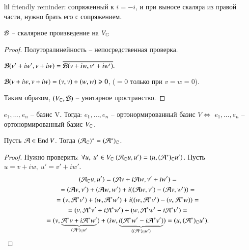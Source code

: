 \documentclass[main]{subfiles}
\begin{document}
    lil friendly reminder: сопряженный к $i = -i$, и при выносе скаляра из правой части, нужно брать его с сопряжением.

    \begin{proposition}
        $\mathcal{B}$ -- скалярное произведение на $V_{\mathbb{C}}$
    \end{proposition}
    \begin{proof}
        Полуторалинейность -- непосредственная проверка. 

        $\mathcal{B}(v'+iw', v+iw) = \overline{\mathcal{B}(v + i w, v' + iw')}.$ 

        $\mathcal{B}(v + iw, v + iw) = (v, v) + (w, w) \geqslant 0$, ($=0$ только при $v = w = 0$).

        Таким образом, $(V_{\mathbb{C}}, \mathcal{B})$ -- унитарное пространство.
    \end{proof}

    \begin{remark}
         $e_1, \ldots, e_n$ -- базис V. Тогда: $e_1, \ldots, e_n$ -- ортонормированный базис $V \Leftrightarrow$  $e_1, \ldots, e_n$ -- ортонормированный базис $V_{\mathbb{C}}$.
    \end{remark}

    \begin{proposition}
        Пусть $\mathcal{A} \in \operatorname{End} V$. Тогда $(\mathcal{A}_{\mathbb{C}})^* = (\mathcal{A}^*)_{\mathbb{C}}$.
    \end{proposition}

    \begin{proof}
        Нужно проверить: $\forall u, \ u' \in V_{\mathbb{C}} \ (\mathcal{A}_{\mathbb{C}}u, u') = (u, (\mathcal{A}^*)_{\mathbb{C}} u')$. 
        Пусть  $u = v + iw, \ u' = v' + iw'$.
        \begin{multline*}
            (\mathcal{A}_{\mathbb{C}}u, u') = (\mathcal{A} v + i \mathcal{A} w, v' + iw') = \\
            = (\mathcal{A} v, v') + (\mathcal{A} w, w') + i((\mathcal{A} w, v') - (\mathcal{A} v, w')) = \\
            = (v, \mathcal{A}^* v') + (w, \mathcal{A}^* w') + i((w, \mathcal{A}^* v') - (v, \mathcal{A}^*w)) = \\
            = (v, \mathcal{A}^*v' + i\mathcal{A}^*w') + (w, \mathcal{A}^*w' - i\mathcal{A}^* v') = \\
            = (v, \underbrace{\mathcal{A}^*v+ i\mathcal{A}^* w'}_{(\mathcal{A}^*)_{\mathbb{C}}u'}) + (iw, \underbrace{i(\mathcal{A}^*w'-i\mathcal{A}^*v')}_{((\mathcal{A}^*)_{\mathbb{C}}u')}) = (u, (\mathcal{A}^*)_{\mathbb{C}} u').
        \end{multline*}
    \end{proof}
\end{document}

